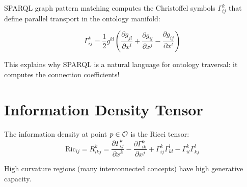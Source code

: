 SPARQL graph pattern matching computes the Christoffel symbols $\Gamma^k_{ij}$ that define parallel transport in the ontology manifold:

\begin{equation}
\Gamma^k_{ij} = \frac{1}{2} g^{kl} \left( \frac{\partial g_{jl}}{\partial x^i} + \frac{\partial g_{il}}{\partial x^j} - \frac{\partial g_{ij}}{\partial x^l} \right)
\end{equation}

This explains why SPARQL is a natural language for ontology traversal: it computes the connection coefficients!

\section{Information Density Tensor}

\begin{definition}
The information density at point $p \in \mathcal{O}$ is the Ricci tensor:
\begin{equation}
\text{Ric}_{ij} = R^k_{ikj} = \frac{\partial \Gamma^k_{ij}}{\partial x^k} - \frac{\partial \Gamma^k_{ik}}{\partial x^j} + \Gamma^k_{ij}\Gamma^l_{kl} - \Gamma^k_{il}\Gamma^l_{kj}
\end{equation}
\end{definition}

High curvature regions (many interconnected concepts) have high generative capacity.
